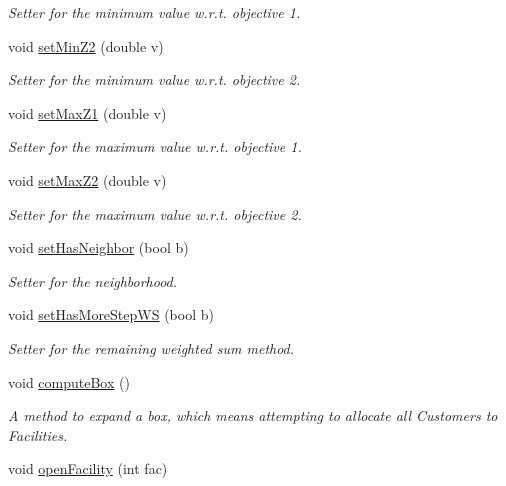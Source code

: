 \begin{DoxyCompactItemize}
\begin{DoxyCompactList}\small\item\em \-Setter for the minimum value w.\-r.\-t. objective 1. \end{DoxyCompactList}\item 
void \hyperlink{classBox_a5ac9cf265d3b0931437c42e755a6b017}{set\-Min\-Z2} (double v)
\begin{DoxyCompactList}\small\item\em \-Setter for the minimum value w.\-r.\-t. objective 2. \end{DoxyCompactList}\item 
void \hyperlink{classBox_a79ac09e6f2c8e05bdb5e8d9e27c89f1a}{set\-Max\-Z1} (double v)
\begin{DoxyCompactList}\small\item\em \-Setter for the maximum value w.\-r.\-t. objective 1. \end{DoxyCompactList}\item 
void \hyperlink{classBox_a1d9913b6b5ff4a73a58e7f6c4783239c}{set\-Max\-Z2} (double v)
\begin{DoxyCompactList}\small\item\em \-Setter for the maximum value w.\-r.\-t. objective 2. \end{DoxyCompactList}\item 
void \hyperlink{classBox_a7ff6267ac9ef0374a4124990e098dec7}{set\-Has\-Neighbor} (bool b)
\begin{DoxyCompactList}\small\item\em \-Setter for the neighborhood. \end{DoxyCompactList}\item 
void \hyperlink{classBox_a17421cfc8975b2167736cf6bfd70d0e2}{set\-Has\-More\-Step\-W\-S} (bool b)
\begin{DoxyCompactList}\small\item\em \-Setter for the remaining weighted sum method. \end{DoxyCompactList}\item 
void \hyperlink{classBox_a5ea285f88a7d98adcc564a9b8f36ca6e}{compute\-Box} ()
\begin{DoxyCompactList}\small\item\em \-A method to expand a box, which means attempting to allocate all {\ttfamily \-Customers} to {\ttfamily \-Facilities}. \end{DoxyCompactList}\item 
void \hyperlink{classBox_af9e9149bc27c244e5b9d64df691ba2b1}{open\-Facility} (int fac)

\end{DoxyCompactItemize}

